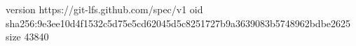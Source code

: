 version https://git-lfs.github.com/spec/v1
oid sha256:9e3ee10d4f1532c5d75e5cd62045d5c8251727b9a3639083b5748962bdbe2625
size 43840
